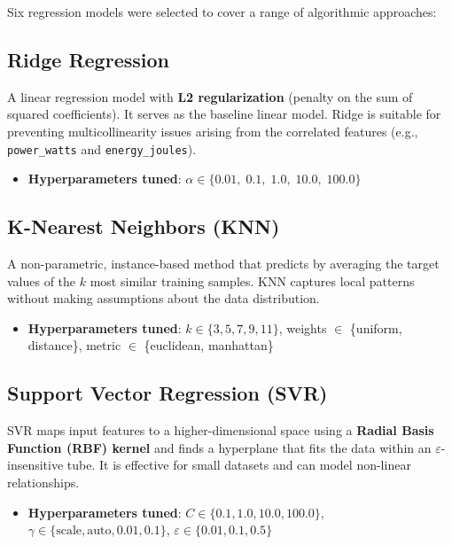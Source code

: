Six regression models were selected to cover a range of algorithmic approaches:

\subsection{Ridge Regression}

A linear regression model with \textbf{L2 regularization} (penalty on the sum of squared coefficients). It serves as the baseline linear model. Ridge is suitable for preventing multicollinearity issues arising from the correlated features (e.g., \texttt{power\_watts} and \texttt{energy\_joules}).

\begin{itemize}
    \item \textbf{Hyperparameters tuned}: $\alpha \in \{0.01,\; 0.1,\; 1.0,\; 10.0,\; 100.0\}$
\end{itemize}


\subsection{K-Nearest Neighbors (KNN)}

A non-parametric, instance-based method that predicts by averaging the target values of the $k$ most similar training samples. KNN captures local patterns without making assumptions about the data distribution.

\begin{itemize}
    \item \textbf{Hyperparameters tuned}: $k \in \{3, 5, 7, 9, 11\}$, weights $\in$ \{uniform, distance\}, metric $\in$ \{euclidean, manhattan\}
\end{itemize}


\subsection{Support Vector Regression (SVR)}

SVR maps input features to a higher-dimensional space using a \textbf{Radial Basis Function (RBF) kernel} and finds a hyperplane that fits the data within an $\varepsilon$-insensitive tube. It is effective for small datasets and can model non-linear relationships.

\begin{itemize}
    \item \textbf{Hyperparameters tuned}: $C \in \{0.1, 1.0, 10.0, 100.0\}$, $\gamma \in \{\text{scale}, \text{auto}, 0.01, 0.1\}$, $\varepsilon \in \{0.01, 0.1, 0.5\}$
\end{itemize}


